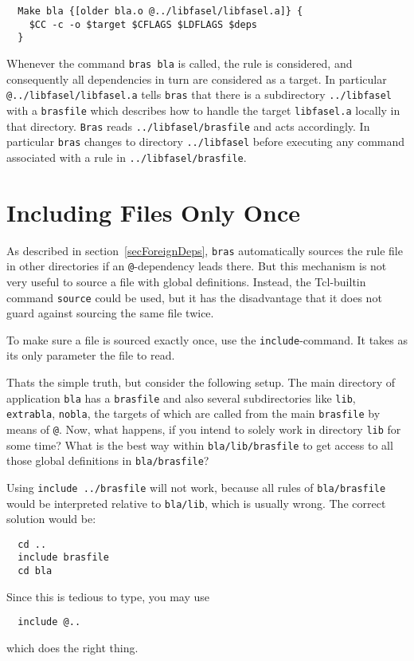 \documentclass[11pt]{scrartcl}
\makeatletter
\newcommand{\bras}{\texttt{bras}}
\newcommand{\Bras}{\texttt{Bras}}
\newcommand{\indextt}[1]{\index{#1@\texttt{#1}}}
\newcommand{\Indextt}[1]{\texttt{#1}\index{#1@\texttt{#1}}}
\makeatother
\begin{document}
\begin{verbatim}
  Make bla {[older bla.o @../libfasel/libfasel.a]} {
    $CC -c -o $target $CFLAGS $LDFLAGS $deps
  }
\end{verbatim}

Whenever the command \texttt{bras bla} is called, the rule is
considered, and consequently all dependencies in turn are considered
as a target. In particular \texttt{@../libfasel/lib\-fasel.a} tells
\bras{} that there is a subdirectory \texttt{../libfasel} with a
\texttt{brasfile} which describes how to handle the target
\texttt{libfasel.a} locally in that directory. \Bras{} reads
\texttt{../libfasel/bras\-file} and acts accordingly. In particular
\bras{} changes to directory \texttt{../libfasel} before executing any
command associated with a rule in \texttt{../libfasel/brasfile}.

\section{Including Files Only Once}
\label{secInclude}

As described in section~\ref{secForeignDeps}, \bras{} automatically
sources the rule file in other directories if an \texttt{@}-dependency
leads there. But this mechanism is not very useful to source a file
with global definitions. Instead, the Tcl-builtin command
\Indextt{source} could be used, but it has the disadvantage that it
does not guard against sourcing the same file twice.

To make sure a file is sourced exactly once, use the
\Indextt{include}-command. It takes as its only parameter the file to
read.

Thats the simple truth, but consider the following setup. The main
directory of application \texttt{bla} has a \texttt{brasfile} and also
several subdirectories like \texttt{lib}, \texttt{extrabla},
\texttt{nobla}, the targets of which are called from the main
\texttt{brasfile} by means of \texttt{@}. Now, what happens, if you
intend to solely work in directory \texttt{lib} for some time?  What
is the best way within \texttt{bla/lib/brasfile} to get access to all
those global definitions in
\texttt{bla/brasfile}?

Using \texttt{include ../brasfile} will not work, because all
rules of \texttt{bla/brasfile} would be interpreted relative to
\texttt{bla/lib}, which is usually wrong. The correct solution would
be:
\begin{verbatim}
  cd ..
  include brasfile
  cd bla
\end{verbatim}
Since this is tedious to type, you may use
\begin{verbatim}
  include @..
\end{verbatim}
\indextt{"@..}
which does the right thing.
\end{document}
